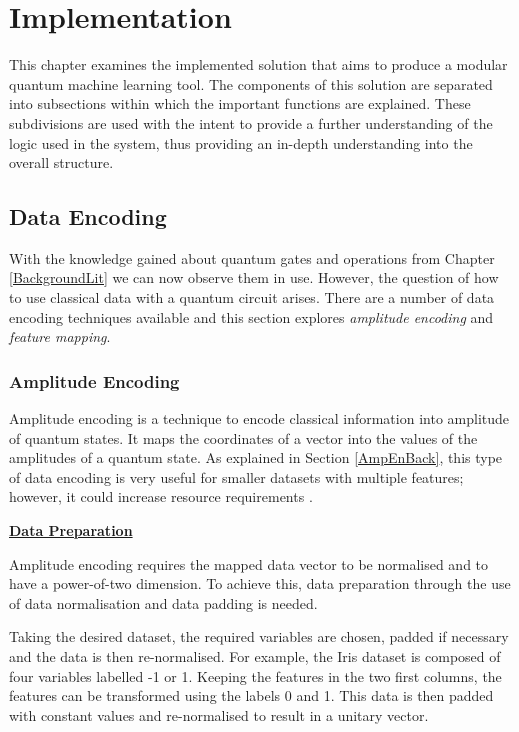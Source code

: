\chapter{Implementation}\label{sec3}
This chapter examines the implemented solution %
that aims to produce a modular quantum machine learning tool. The components of this solution are separated into subsections within which the important functions are explained. These subdivisions are used with the intent to provide a further understanding of the logic used in the system, thus providing an in-depth understanding into the overall structure.


\section{Data Encoding}
With the knowledge gained about quantum gates and operations from Chapter \ref{BackgroundLit} we can now observe them in use. However, the question of how to use classical data with a quantum circuit arises. There are a number of data encoding techniques available and this section explores \emph{amplitude encoding} and \emph{feature mapping}.

\subsection{Amplitude Encoding}
Amplitude encoding is a technique to encode classical information into amplitude of quantum states. It maps the coordinates of a vector into the values of the amplitudes of a quantum state. %
As explained in Section \ref{AmpEnBack}, this type of data encoding is very useful for smaller datasets with multiple features; however, it could increase resource requirements \citep{QiskitFMap}.  


\vspace{0.3cm}
\textbf{\underline{Data Preparation}}
\label{PrepData}

Amplitude encoding requires the mapped data vector to be normalised and to have a power-of-two dimension. To achieve this, data preparation through the use of data normalisation and data padding is needed.

Taking the desired dataset, the required variables are chosen, padded if necessary and the data is then re-normalised. For example, the Iris dataset is composed of four variables labelled -1 or 1. Keeping the features in the two first columns, the features can be transformed using the labels 0 and 1. This data is then padded with constant values and re-normalised to result in a unitary vector.

